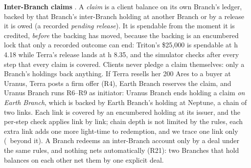 \textbf{Inter-Branch claims} \implemented. A \emph{claim} is a client balance on its own Branch's ledger, backed by that
Branch's inter-Branch holding at another Branch or by a release it is owed (a recorded \emph{pending release}). It is
spendable from the moment it is credited, \emph{before} the backing has moved, because the backing is an encumbered lock
that only a recorded outcome can end: Triton's \$25{,}000 is spendable at h 4.18 while Terra's release lands at h 8.35, and
the simulator checks after every step that every claim is covered. Clients never pledge a claim themselves: only a Branch's
holdings back anything. If Terra resells her 200 Ares to a buyer at Uranus, Terra posts a firm offer (R4), Earth Branch
reserves the claim, and Uranus Branch runs R6--R9 as initiator: Uranus Branch ends holding a claim \emph{on Earth Branch},
which is backed by Earth Branch's holding at Neptune, a chain of two links. Each link is covered by an encumbered
holding at its issuer, and the per-step check applies link by link; chain depth is not limited by the rules, each extra
link adds one more light-time to redemption, and we trace one link only (\conditional\ beyond it). A Branch redeems an
inter-Branch account only by a deal under the same rules, and nothing nets automatically (R21): two Branches that hold
balances on each other net them by one explicit deal.

